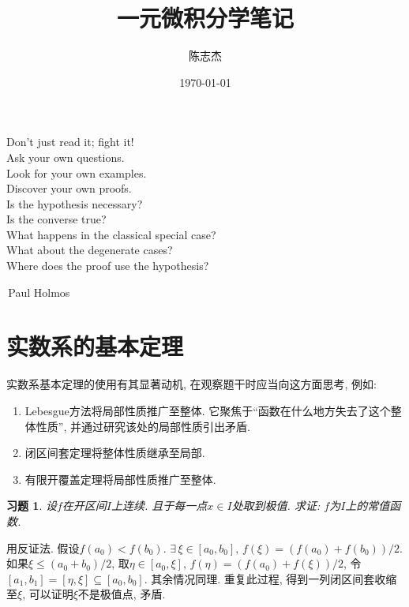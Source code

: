 \documentclass[11pt,a4paper]{ctexart}
\title{一元微积分学笔记}
\author{陈志杰}
\date{\today}
\makeatletter
\theoremstyle{thmseries} %
\theoremstyle{exerseries}
\newtheorem{exer}{习题}[section]
\renewenvironment{proof}[1][\proofname]{\par
  \pushQED{\qed}%
  \normalfont \topsep6\p@\@plus6\p@\relax
  \trivlist
  \item[\hskip\labelsep
        \itshape
    #1\@addpunct{}]\ignorespaces
}{%
  \popQED\endtrivlist\@endpefalse
}
\newenvironment{pf}{\begin{proof}[\bfseries\upshape 证\quad]}{\end{proof}}
\makeatother
\begin{document}
\maketitle
\thispagestyle{empty}
\tableofcontents
\justifying
\newpage


{\Large\thispagestyle{empty}
\vspace*{\fill}
\begin{center}
	\garamond
	\Large
	Don't just read it; fight it!\\
	Ask your own questions.\\
	Look for your own examples.\\
	Discover your own proofs.\\
	Is the hypothesis necessary?\\
	Is the converse true?\\
	What happens in the classical special case?\\
	What about the degenerate cases?\\
	Where does the proof use the hypothesis?
\end{center}
\begin{flushright}
	\garamond
	\textemdash\,Paul Holmos\phantom{placeholderrrrr}
\end{flushright}
\vspace*{\fill}
\newpage}


\section{实数系的基本定理}
实数系基本定理的使用有其显著动机, 在观察题干时应当向这方面思考, 例如:
\begin{enumerate}
	\item Lebesgue方法将局部性质推广至整体. 它聚焦于``函数在什么地方失去了这个整体性质'', 并通过研究该处的局部性质引出矛盾. 
	\item 闭区间套定理将整体性质继承至局部. 
	\item 有限开覆盖定理将局部性质推广至整体. 
\end{enumerate}

\begin{exer}
	设$f$在开区间$I$上连续. 且于每一点$x\in I$处取到极值. 求证: $f$为$I$上的常值函数. 
\end{exer}
\begin{pf}
	用反证法. 假设$f(a_0)<f(b_0)$. $\exists\,\xi\in[a_0,b_0],\,f(\xi)=(f(a_0)+f(b_0))/2$. 如果$\xi\leq(a_0+b_0)/2$, 取$\eta\in[a_0,\xi],\,f(\eta)=(f(a_0)+f(\xi))/2$, 令$[a_1,b_1]=[\eta,\xi]\subseteq[a_0,b_0]$. 其余情况同理. 重复此过程, 得到一列闭区间套收缩至$\xi$, 可以证明$\xi$不是极值点, 矛盾. 
\end{pf}
\end{document}

